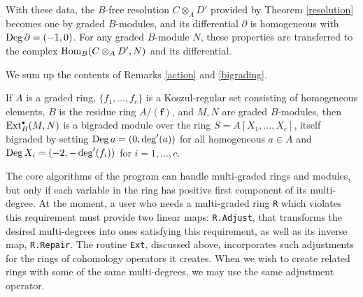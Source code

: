 \begin{Remark}
With these data, the $B$-free resolution $C\otimes_A D'$ provided by
Theorem \ref{resolution} becomes one by graded $B$-modules, and
its differential $\partial$ is homogeneous with $\operatorname{Deg}
\partial=(-1,0)$.  For any graded $B$-module $N$, these properties are
transferred to the complex $\operatorname{Hom}_B(C\otimes_A D',N)$ and its
differential.
 \end{Remark}

We sum up the contents of Remarks \ref{action} and \ref{bigrading}.

\begin{Remark}
\label{graded action}
If $A$ is a graded ring, $\{f_1, \dots, f_c\}$ is a Koszul-regular set
consisting of homogeneous elements, $B$ is the residue ring
$A/({\boldsymbol f})$, and $M,N$ are graded $B$-modules, then
$\operatorname{Ext}^{\scriptscriptstyle\bullet}_B(M,N)$ is a bigraded module over the ring
$S=A[X_1,\dots,X_c]$, itself bigraded by setting $\operatorname{Deg} a = (0,
\deg'(a))$ for all homogeneous $a\in A$ and $\operatorname{Deg} X_i =
(-2,-\deg'(f_i))$ for $i=1,\dots,c$.
 \end{Remark}

\begin{Remark}
\label{macaulay grading}
The core algorithms of the program can handle multi-graded rings and
modules, but only if each variable in the ring has positive first
component of its multi-degree.  At the moment, a user who needs a
multi-graded ring {\tt R} which violates this requirement must provide
two linear maps: {\tt R.Adjust}, that transforms the desired
multi-degrees into ones satisfying this requirement, as well as its
inverse map, {\tt R.Repair}.  The routine {\tt Ext}, discussed above,
incorporates such adjustments for the rings of cohomology operators it
creates.  When we wish to create related rings with some of the same
multi-degrees, we may use the same adjustment operator.
 \end{Remark}

